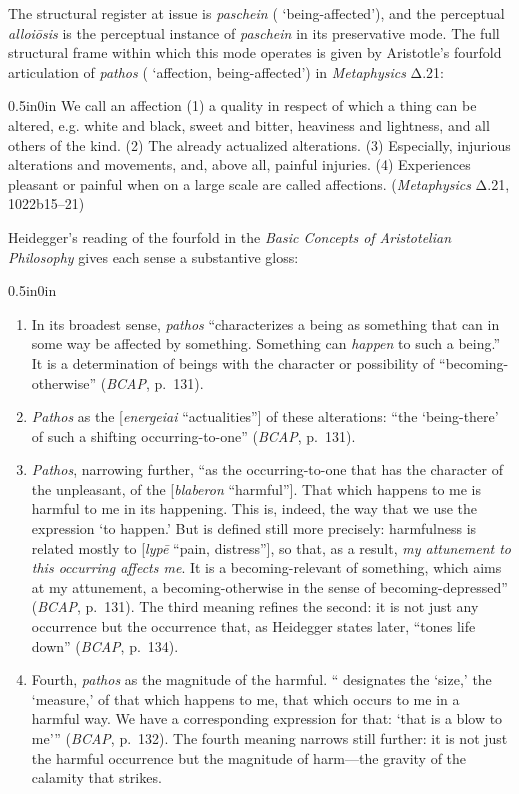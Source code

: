 The structural register at issue is \textit{paschein} ( `being-affected'), and the perceptual \textit{alloiōsis} is the perceptual instance of \textit{paschein} in its preservative mode. The full structural frame within which this mode operates is given by Aristotle's fourfold articulation of \textit{pathos} ( `affection, being-affected') in \textit{Metaphysics} Δ.21:
\begin{adjustwidth}{0.5in}{0in}
We call an affection (1) a quality in respect of which a thing can be altered, e.g. white and black, sweet and bitter, heaviness and lightness, and all others of the kind. (2) The already actualized alterations. (3) Especially, injurious alterations and movements, and, above all, painful injuries. (4) Experiences pleasant or painful when on a large scale are called affections. (\textit{Metaphysics} Δ.21, 1022b15--21)
\end{adjustwidth}
Heidegger's reading of the fourfold in the \textit{Basic Concepts of Aristotelian Philosophy} gives each sense a substantive gloss:
\begin{adjustwidth}{0.5in}{0in}
    \begin{enumerate}
        \item In its broadest sense, \textit{pathos} ``characterizes a being as something that can in some way be affected by something. Something can \textit{happen} to such a being.'' It is a determination of beings with the character or possibility of ``becoming-otherwise'' (\textit{BCAP}, p.~131).
        \item \textit{Pathos} as the  [\textit{energeiai} ``actualities''] of these alterations: ``the `being-there' of such a shifting occurring-to-one'' (\textit{BCAP}, p.~131).
        \item \textit{Pathos}, narrowing further, ``as the occurring-to-one that has the character of the unpleasant, of the  [\textit{blaberon} ``harmful'']. That which happens to me is harmful to me in its happening. This is, indeed, the way that we use the expression `to happen.' But  is defined still more precisely: harmfulness is related mostly to  [\textit{lypē} ``pain, distress''], so that, as a result, \textit{my attunement to this occurring affects me}. It is a becoming-relevant of something, which aims at my attunement, a becoming-otherwise in the sense of becoming-depressed'' (\textit{BCAP}, p.~131). The third meaning refines the second: it is not just any occurrence but the occurrence that, as Heidegger states later, ``tones life down'' (\textit{BCAP}, p.~134).
        \item Fourth, \textit{pathos} as the magnitude of the harmful. `` designates the `size,' the `measure,' of that which happens to me, that which occurs to me in a harmful way. We have a corresponding expression for that: `that is a blow to me''' (\textit{BCAP}, p.~132). The fourth meaning narrows still further: it is not just the harmful occurrence but the magnitude of harm---the gravity of the calamity that strikes.
    \end{enumerate}
\end{adjustwidth}

